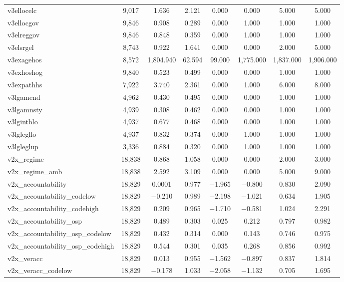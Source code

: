 \begin{table}[!htbp]
\begin{tabular}{@{\extracolsep{5pt}}lccccccc}
v3ellocelc & 9,017 & 1.636 & 2.121 & 0.000 & 0.000 & 5.000 & 5.000 \\ 
v3ellocgov & 9,846 & 0.908 & 0.289 & 0.000 & 1.000 & 1.000 & 1.000 \\ 
v3elreggov & 9,846 & 0.848 & 0.359 & 0.000 & 1.000 & 1.000 & 1.000 \\ 
v3elsrgel & 8,743 & 0.922 & 1.641 & 0.000 & 0.000 & 2.000 & 5.000 \\ 
v3exagehos & 8,572 & 1,804.940 & 62.594 & 99.000 & 1,775.000 & 1,837.000 & 1,906.000 \\ 
v3exhoshog & 9,840 & 0.523 & 0.499 & 0.000 & 0.000 & 1.000 & 1.000 \\ 
v3expathhs & 7,922 & 3.740 & 2.361 & 0.000 & 1.000 & 6.000 & 8.000 \\ 
v3lgamend & 4,962 & 0.430 & 0.495 & 0.000 & 0.000 & 1.000 & 1.000 \\ 
v3lgamnsty & 4,939 & 0.308 & 0.462 & 0.000 & 0.000 & 1.000 & 1.000 \\ 
v3lgintblo & 4,937 & 0.677 & 0.468 & 0.000 & 0.000 & 1.000 & 1.000 \\ 
v3lglegllo & 4,937 & 0.832 & 0.374 & 0.000 & 1.000 & 1.000 & 1.000 \\ 
v3lgleglup & 3,336 & 0.884 & 0.320 & 0.000 & 1.000 & 1.000 & 1.000 \\ 
v2x\_regime & 18,838 & 0.868 & 1.058 & 0.000 & 0.000 & 2.000 & 3.000 \\ 
v2x\_regime\_amb & 18,838 & 2.592 & 3.109 & 0.000 & 0.000 & 5.000 & 9.000 \\ 
v2x\_accountability & 18,829 & 0.0001 & 0.977 & $-$1.965 & $-$0.800 & 0.830 & 2.090 \\ 
v2x\_accountability\_codelow & 18,829 & $-$0.210 & 0.989 & $-$2.198 & $-$1.021 & 0.634 & 1.905 \\ 
v2x\_accountability\_codehigh & 18,829 & 0.209 & 0.965 & $-$1.710 & $-$0.581 & 1.024 & 2.291 \\ 
v2x\_accountability\_osp & 18,829 & 0.489 & 0.303 & 0.025 & 0.212 & 0.797 & 0.982 \\ 
v2x\_accountability\_osp\_codelow & 18,829 & 0.432 & 0.314 & 0.000 & 0.143 & 0.746 & 0.975 \\ 
v2x\_accountability\_osp\_codehigh & 18,829 & 0.544 & 0.301 & 0.035 & 0.268 & 0.856 & 0.992 \\ 
v2x\_veracc & 18,829 & 0.013 & 0.955 & $-$1.562 & $-$0.897 & 0.837 & 1.814 \\ 
v2x\_veracc\_codelow & 18,829 & $-$0.178 & 1.033 & $-$2.058 & $-$1.132 & 0.705 & 1.695 \\ 

\end{tabular}
\end{table}

